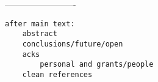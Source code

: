 -------------------------

\begin{verbatim}
after main text:
    abstract
    conclusions/future/open
    acks
    	personal and grants/people
    clean references
\end{verbatim}

